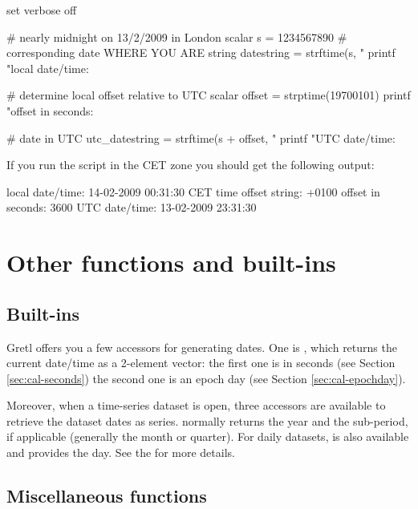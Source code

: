 \begin{script}[htbp]
  \label{ex:tzoffset}
\begin{scodebit}
set verbose off

# nearly midnight on 13/2/2009 in London
scalar s = 1234567890
# corresponding date WHERE YOU ARE
string datestring = strftime(s, "%
printf "local date/time: %

# determine local offset relative to UTC
scalar offset = strptime(19700101)
printf "offset in seconds: %

# date in UTC
utc_datestring = strftime(s + offset, "%
printf "UTC date/time: %
\end{scodebit}
If you run the script in the CET zone you should get the following
output:
\begin{outbit}
local date/time: 14-02-2009 00:31:30 CET
time offset string: +0100
offset in seconds: 3600
UTC date/time: 13-02-2009 23:31:30
\end{outbit}
\end{script}

\section{Other functions and built-ins}
\label{sec:cal-otherfuncs}

\subsection{Built-ins}
\label{sec:cal-builtins}

Gretl offers you a few accessors for generating dates. One is
, which returns the current date/time as a 2-element
vector: the first one is in seconds (see Section
\ref{sec:cal-seconds}) the second one is an epoch day (see Section
\ref{sec:cal-epochday}).

Moreover, when a time-series dataset is open, three accessors are
available to retrieve the dataset dates as series. 
normally returns the year and  the sub-period, if
applicable (generally the month or quarter). For daily datasets,
 is also available and provides the day. See the
\GCR{} for more details.

\subsection{Miscellaneous functions}
\label{sec:cal-misc}

